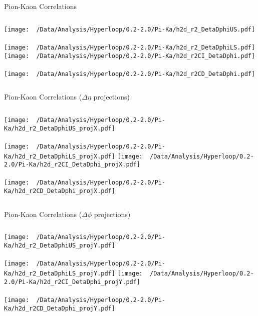 \documentclass{beamer}
\begin{document}
\begin{frame}{Pion-Kaon Correlations}
	\begin{columns}
		\centering
		\texttt{[image: ~/Data/Analysis/Hyperloop/0.2-2.0/Pi-Ka/h2d\_r2\_DetaDphiUS.pdf]}\\~\\
		\texttt{[image: ~/Data/Analysis/Hyperloop/0.2-2.0/Pi-Ka/h2d\_r2\_DetaDphiLS.pdf]}
		\centering
		\texttt{[image: ~/Data/Analysis/Hyperloop/0.2-2.0/Pi-Ka/h2d\_r2CI\_DetaDphi.pdf]}\\~\\
		\texttt{[image: ~/Data/Analysis/Hyperloop/0.2-2.0/Pi-Ka/h2d\_r2CD\_DetaDphi.pdf]}
	\end{columns}
\end{frame}
\begin{frame}{Pion-Kaon Correlations ($\Delta\eta$ projections)}
	\begin{columns}
		\column{0.5\linewidth}
		\centering
		\texttt{[image: ~/Data/Analysis/Hyperloop/0.2-2.0/Pi-Ka/h2d\_r2\_DetaDphiUS\_projX.pdf]}\\~\\
		\texttt{[image: ~/Data/Analysis/Hyperloop/0.2-2.0/Pi-Ka/h2d\_r2\_DetaDphiLS\_projX.pdf]}
		\column{0.5\linewidth}
		\centering
		\texttt{[image: ~/Data/Analysis/Hyperloop/0.2-2.0/Pi-Ka/h2d\_r2CI\_DetaDphi\_projX.pdf]}\\~\\
		\texttt{[image: ~/Data/Analysis/Hyperloop/0.2-2.0/Pi-Ka/h2d\_r2CD\_DetaDphi\_projX.pdf]}
	\end{columns}
\end{frame}
\begin{frame}{Pion-Kaon Correlations ($\Delta\phi$ projections)}
	\begin{columns}
		\centering
		\texttt{[image: ~/Data/Analysis/Hyperloop/0.2-2.0/Pi-Ka/h2d\_r2\_DetaDphiUS\_projY.pdf]}\\~\\
		\texttt{[image: ~/Data/Analysis/Hyperloop/0.2-2.0/Pi-Ka/h2d\_r2\_DetaDphiLS\_projY.pdf]}
		\centering
		\texttt{[image: ~/Data/Analysis/Hyperloop/0.2-2.0/Pi-Ka/h2d\_r2CI\_DetaDphi\_projY.pdf]}\\~\\
		\texttt{[image: ~/Data/Analysis/Hyperloop/0.2-2.0/Pi-Ka/h2d\_r2CD\_DetaDphi\_projY.pdf]}
	\end{columns}
\end{frame}
\end{document}

